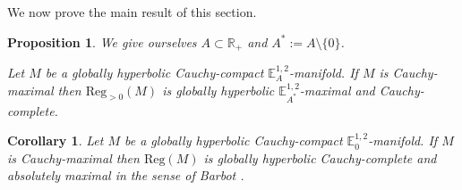 \documentclass[a4paper,12pt]{article}
\def\RR{\mathbb{R}}
\newcommand{\mass}[1]{{\mathbb E}^{1,2}_{#1}}
\def\Reg{\mathrm{Reg}}
\def\reg{\Reg}
\newtheorem{propou}[lemou]{Proposition}
\newtheorem{corou}[lemou]{Corollary}
\begin{document}
We now prove the main result of this section.
\begin{propou}\label{btzprop:abs_max}\label{prop:abs_max} We give ourselves $A\subset \RR_+$ and $A^*:=A\setminus \{0\}$.

 Let $M$ be a globally hyperbolic Cauchy-compact $\mass{A}$-manifold. 
 If $M$ is Cauchy-maximal then $\reg_{>0}(M)$ is globally hyperbolic $\mass{A^*}$-maximal and Cau\-chy-complete.
\end{propou}
\begin{corou}\label{btzcor:abs_max}\label{cor:abs_max}
 Let $M$ be a globally hyperbolic Cauchy-compact $\mass{0}$-mani\-fold. 
 If $M$ is Cauchy-maximal then $\Reg(M)$ is globally hyperbolic Cauchy-complete and absolutely maximal in the sense of Barbot \cite{barbot_globally_2004}.
\end{corou}
 
\end{document}
